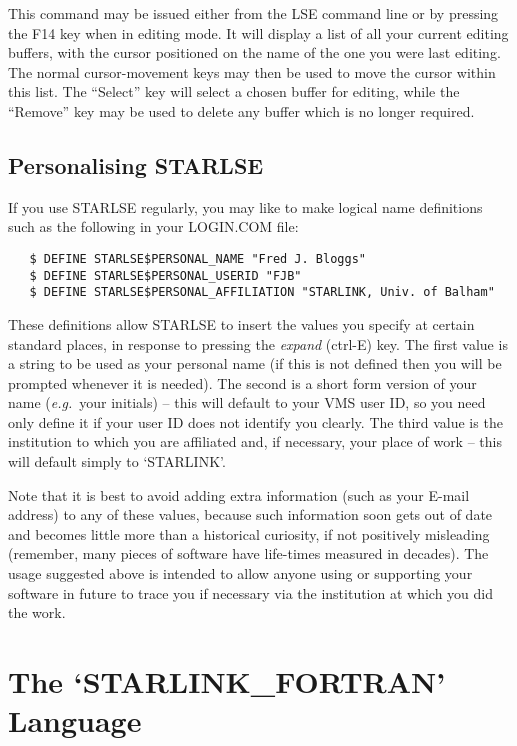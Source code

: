 This command may be issued either from the LSE command line or by pressing the
F14 key when in editing mode. It will display a list of all your current
editing buffers, with the cursor positioned on the name of the one you were
last editing. The normal cursor-movement keys may then be used to move the
cursor within this list. The ``Select'' key will select a chosen buffer for
editing, while the ``Remove'' key may be used to delete any buffer which is no
longer required.

\subsection{Personalising STARLSE}

If you use \mbox{STARLSE} regularly, you may like to make logical name
definitions such as the following in your \mbox{LOGIN.COM} file:

\begin{verbatim}
   $ DEFINE STARLSE$PERSONAL_NAME "Fred J. Bloggs"
   $ DEFINE STARLSE$PERSONAL_USERID "FJB"
   $ DEFINE STARLSE$PERSONAL_AFFILIATION "STARLINK, Univ. of Balham"
\end{verbatim}

These definitions allow \mbox{STARLSE} to insert the values you specify at
certain standard places, in response to pressing the {\em expand} (ctrl-E)
key.
The first value is a string to be used as your personal name (if this is not
defined then you will be prompted whenever it is needed).
The second is a short form version of your name ({\em e.g.}\ your initials)
-- this will default to your \mbox{VMS} user ID, so you need only define it
if your user ID does not identify you clearly.
The third value is the institution to which you are affiliated and, if
necessary, your place of work -- this will default simply to `STARLINK'.

Note that it is best to avoid adding extra information (such as your E-mail
address) to any of these values, because such information soon gets out of
date and becomes little more than a historical curiosity, if not positively
misleading (remember, many pieces of software have life-times measured in
decades).
The usage suggested above is intended to allow anyone using or supporting
your software in future to trace you if necessary via the institution at
which you did the work.

\section{The `STARLINK\_FORTRAN' Language}

